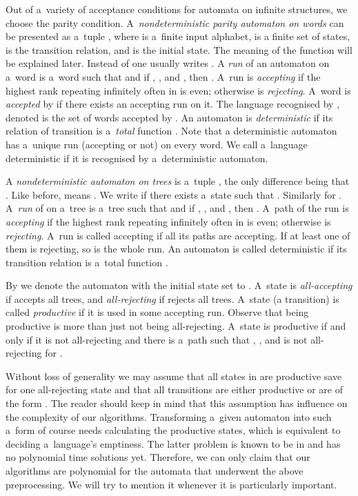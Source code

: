 \documentclass{LMCS}
\begin{document}
Out of a~variety of acceptance conditions for automata on infinite
structures, we choose the parity condition. A~{\em nondeterministic
  parity automaton on words}  can be presented as a~tuple , where  is
a~finite input alphabet,  is a finite set of states,  is the transition relation, and  is the initial state. The meaning of the function  will be explained later. Instead of  one usually writes . A {\em run} of an automaton  on a~word  is a~word  such that  and if , , and , then . A~run  is {\em accepting} if the highest rank repeating infinitely often in  is even; otherwise  is {\em rejecting}. A~word is {\em accepted} by  if there exists an accepting run on it. The language recognised by , denoted  is the set of words accepted by . An automaton is {\em deterministic} if its relation of transition is a~{\em total} function . Note that a deterministic automaton has a~unique run (accepting or not) on every word. We call a~language deterministic if it is recognised by a~deterministic automaton.

A {\em nondeterministic automaton on trees}  is a~tuple , the only difference being that . Like before,  means . We write   if there exists a~state  such that . Similarly for  . A~{\em run} of  on a~tree  is a~tree  such that  and if , ,  and , then . A~path  of the run  is {\em accepting} if the highest rank repeating infinitely often in  is even; otherwise  is {\em rejecting}. A~run is called accepting if all its paths are accepting. If at least one of them is rejecting, so is the whole run. An automaton is called deterministic if its transition relation is a~total function .


By  we denote the automaton  with the initial state set to . A~state  is {\em all-accepting}  if  accepts all trees, and {\em all-rejecting} if  rejects all trees. A~state (a transition) is called {\em productive} if it is used in some accepting run. Observe that being productive is more than just not being all-rejecting. A~state  is productive if and only if it is not all-rejecting and there is a~path  such that , , and  is  not all-rejecting for .

Without loss of generality we may assume that all states in  are productive save for one all-rejecting state  and that all transitions are either productive or are of the form . The reader should keep in mind that this assumption has influence on the complexity of our algorithms. Transforming a~given automaton into such a~form of course needs calculating the productive states, which is equivalent to deciding a~language's emptiness. The latter problem is known to be in  and has no polynomial time solutions yet. Therefore, we can only claim that our algorithms are polynomial for the automata that underwent the above preprocessing. We will try to mention it whenever it is particularly important. \label{explicitproductive}
\end{document}
